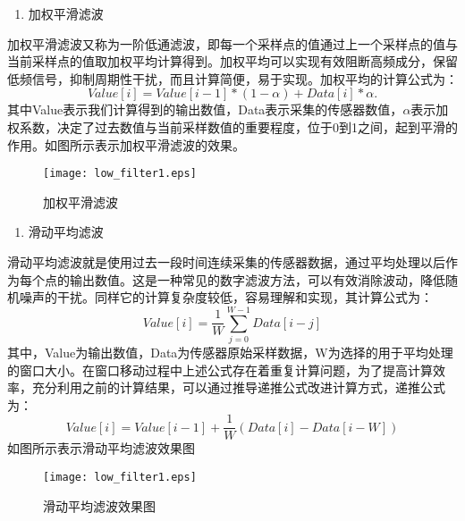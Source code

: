 \begin{enumerate}[(1)]
	\item 加权平滑滤波
\end{enumerate}
\par 加权平滑滤波又称为一阶低通滤波，即每一个采样点的值通过上一个采样点的值与当前采样点的值取加权平均计算得到。加权平均可以实现有效阻断高频成分，保留低频信号，抑制周期性干扰，而且计算简便，易于实现。加权平均的计算公式为：
\begin{equation}
	Value[i] = Value[i-1]*(1-\alpha) + Data[i]*\alpha.
\end{equation}
其中Value表示我们计算得到的输出数值，Data表示采集的传感器数值，$\alpha$表示加权系数，决定了过去数值与当前采样数值的重要程度，位于0到1之间，起到平滑的作用。如图所示表示加权平滑滤波的效果。
\begin{figure}[htb]
\centering
\texttt{[image: low\_filter1.eps]}
\caption{加权平滑滤波}
\end{figure}


\begin{enumerate}[(2)]
	\item 滑动平均滤波
\end{enumerate}

\par 滑动平均滤波就是使用过去一段时间连续采集的传感器数据，通过平均处理以后作为每个点的输出数值。这是一种常见的数字滤波方法，可以有效消除波动，降低随机噪声的干扰。同样它的计算复杂度较低，容易理解和实现，其计算公式为：
\begin{equation}
	Value[i] = \frac{1}{W}\sum_{j=0}^{W-1}Data[i-j]
\end{equation}
其中，Value为输出数值，Data为传感器原始采样数据，W为选择的用于平均处理的窗口大小。在窗口移动过程中上述公式存在着重复计算问题，为了提高计算效率，充分利用之前的计算结果，可以通过推导递推公式改进计算方式，递推公式为：
\begin{equation}
	Value[i] = Value[i-1] + \frac{1}{W}(Data[i] - Data[i-W])
\end{equation}
如图所示表示滑动平均滤波效果图
\begin{figure}[htb]
\centering
\texttt{[image: low\_filter1.eps]}
\caption{滑动平均滤波效果图}
\end{figure}

